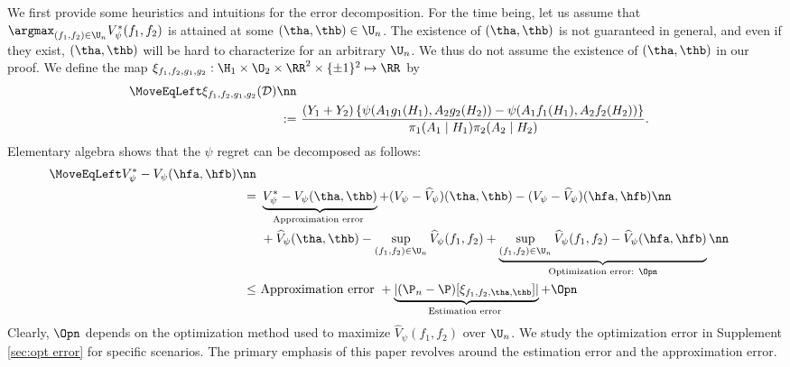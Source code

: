 \documentclass[preprint] {imsart}
\begin{document}
We first provide some heuristics and intuitions for the error decomposition. 
For the time being, let us assume that $\argmax_{(f_1,f_2)\in\U_n}V_\psi^*(f_1,f_2)$ is attained at some $(\tha,\thb)\in\U_n$. The existence of $(\tha,\thb)$ is not guaranteed in general, and even if they exist, $(\tha,\thb)$ will be hard to characterize for an arbitrary $\U_n$. We thus do not assume the existence of $(\tha,\thb)$ in our proof. We define the map
 $\xi_{f_1,f_2,g_1,g_2}:\H_1\times\O_2\times \RR^2\times\{\pm 1\}^2\mapsto\RR$ by
\begin{align}\label{def: GE: xi function}
  \MoveEqLeft  \xi_{f_1,f_2,g_1,g_2}(\mathcal D)\nn\\
    :=&\ \frac{(Y_1+Y_2)\left\{ \psi( A_1g_1(H_1),A_2 g_2(H_2))-\psi( A_1 f_1(H_1),A_2 f_2(H_2)) \right\}}{\pi_1(A_1\mid H_1)\pi_2(A_2\mid H_2)}.
\end{align}
Elementary algebra shows that the $\psi$ regret can be decomposed as follows:
 \begin{align}\label{regret decomposition}
   \MoveEqLeft  V_\psi^*-V_\psi(\hfa,\hfb)\nn\\
     =&\ \underbrace{V_\psi^*-V_\psi(\tha,\thb)}_{\text{Approximation error }}+ (V_\psi-\widehat V_\psi)(\tha,\thb)-(V_\psi-\widehat V_\psi)(\hfa,\hfb)\nn\\
     &\ + \widehat V_\psi(\tha,\thb)- \sup_{(f_1,f_2)\in\U_n}\widehat V_\psi(f_1,f_2)+\underbrace{\sup_{(f_1,f_2)\in\U_n}\widehat V_\psi(f_1,f_2)-\widehat V_\psi(\hfa,\hfb)}_{\text{Optimization error: }\Opn}\nn\\
      \leq &\ \text{Approximation error }+\underbrace{|(\P_n-\P)[\xi_{f_1,f_2,\tha,\thb}]|}_{\text{Estimation error }}+\Opn
 \end{align}
Clearly, $\Opn$ depends on the optimization method used to maximize $\widehat{V}_\psi(f_1,f_2)$ over $\U_n$. {\color{black} We\label{page: error decomposition}  study the optimization error in Supplement \ref{sec:opt error} for specific scenarios. The primary emphasis of this paper revolves around the estimation error and the approximation error. }
\end{document}
